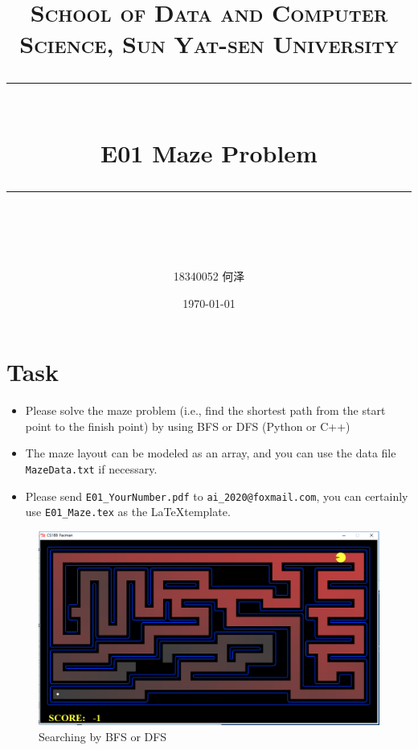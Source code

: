 \documentclass[a4paper, 11pt]{article}
\title{	
\normalfont \normalsize
\textsc{School of Data and Computer Science, Sun Yat-sen University} \\ [25pt] %
\rule{\textwidth}{0.5pt} \\[0.4cm] %
\huge  E01 Maze Problem\\ %
\rule{\textwidth}{2pt} \\[0.5cm] %
\author{18340052   何泽}
\date{\normalsize\today}
}
\begin{document}
\maketitle
\tableofcontents
\newpage
\section{Task}



\begin{itemize}
	\item Please solve the maze problem (i.e., find the shortest path from the start point to the finish point) by using BFS or DFS (Python or C++)
	\item The maze layout can be modeled as an array, and you can use the data file \texttt{MazeData.txt} if necessary.
	\item Please send \texttt{E01\_YourNumber.pdf} to \texttt{ai\_2020@foxmail.com}, you can certainly use \texttt{E01\_Maze.tex} as the \LaTeX template.
\end{itemize}

\begin{figure}[ht]
\centering
\includegraphics[width=15cm]{Pic/Pacman}

\caption{Searching by BFS or DFS}
\end{figure}
\end{document}

